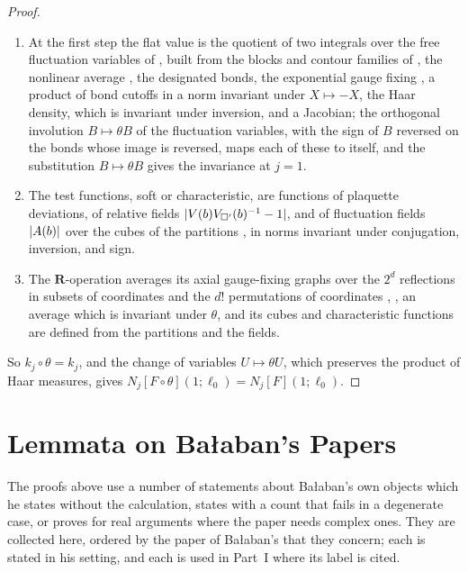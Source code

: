 \documentclass[11pt]{preprint}
\DeclarePairedDelimiter{\abs}{\lvert}{\rvert}
\numberwithin{equation}{section}
\theoremstyle{definition}
\theoremstyle{remark}
\theoremstyle{plain}
\begin{document}
\begin{proof}
\begin{enumerate}[label=(\alph*)]
\item At the first step the flat value is the quotient of two integrals over the free fluctuation variables of \cite[Section~4]{WilsonFirstStep}, built from the blocks and contour families of \cite[Section~0]{BalabanRG1}, the nonlinear average \cite[(0.4)]{BalabanRG1}, the designated bonds, the exponential gauge fixing \cite[(1.7)]{BalabanCRE}, a product of bond cutoffs in a norm invariant under $X \mapsto -X$, the Haar density, which is invariant under inversion, and a Jacobian; the orthogonal involution $B \mapsto \theta B$ of the fluctuation variables, with the sign of $B$ reversed on the bonds whose image is reversed, maps each of these to itself, and the substitution $B \mapsto \theta B$ gives the invariance at $j = 1$.
\item The test functions, soft or characteristic, are functions of plaquette deviations, of relative fields $\abs{V(b)V_{\square'}(b)^{-1} - 1}$, and of fluctuation fields $\abs{A(b)}$ over the cubes of the partitions \cite[(3.2), (3.3), (3.16), pp.~265--268]{BalabanCRE}, in norms invariant under conjugation, inversion, and sign.
\item The $\mathbf R$-operation averages its axial gauge-fixing graphs over the $2^d$ reflections in subsets of coordinates and the $d!$ permutations of coordinates \cite[(1.100), p.~201, ll.~34--38]{BalabanLFR1}, \cite[p.~379]{BalabanLFR2}, an average which is invariant under $\theta$, and its cubes and characteristic functions are defined from the partitions and the fields.
\end{enumerate}
So $k_j \circ \theta = k_j$, and the change of variables $U \mapsto \theta U$, which preserves the product of Haar measures, gives $N_j[F \circ \theta](1; \ell_0) = N_j[F](1; \ell_0)$.
\end{proof}

\section{Lemmata on Ba{\l}aban's Papers}\label{sec:lemmata}

The proofs above use a number of statements about Ba{\l}aban's own objects which he states without the calculation, states with a count that fails in a degenerate case, or proves for real arguments where the paper needs complex ones. They are collected here, ordered by the paper of Ba{\l}aban's that they concern; each is stated in his setting, and each is used in Part~I where its label is cited.
\end{document}
